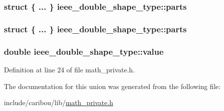 \hypertarget{unionieee__double__shape__type_a56d56a067ef071ada93836397ea0050a}{
\subsubsection[{parts}]{\setlength{\rightskip}{0pt plus 5cm}struct \{ ... \}   ieee\-\_\-double\-\_\-shape\-\_\-type\-::parts}}\label{unionieee__double__shape__type_a56d56a067ef071ada93836397ea0050a}
\hypertarget{unionieee__double__shape__type_a14b6183c096c0f76d6596e3c737d3c9b}{
\subsubsection[{parts}]{\setlength{\rightskip}{0pt plus 5cm}struct \{ ... \}   ieee\-\_\-double\-\_\-shape\-\_\-type\-::parts}}\label{unionieee__double__shape__type_a14b6183c096c0f76d6596e3c737d3c9b}
\hypertarget{unionieee__double__shape__type_a2d9c4cab9e3fa74e4be6d72f798a145b}{
\subsubsection[{value}]{\setlength{\rightskip}{0pt plus 5cm}double ieee\-\_\-double\-\_\-shape\-\_\-type\-::value}}\label{unionieee__double__shape__type_a2d9c4cab9e3fa74e4be6d72f798a145b}


Definition at line 24 of file math\-\_\-private.\-h.



The documentation for this union was generated from the following file\-:\begin{DoxyCompactItemize}
\item 
include/caribou/lib/\hyperlink{math__private_8h}{math\-\_\-private.\-h}\end{DoxyCompactItemize}

